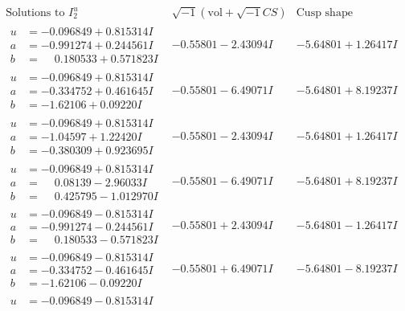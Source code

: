 \documentclass[1p]{elsarticle_modified}
\theoremstyle{definition}
\newcommand{\I}{\sqrt{-1}}
\begin{document}
$$\begin{array}{c|c|c}  
\text{Solutions to }I^u_{2}& \I (\text{vol} + \sqrt{-1}CS) & \text{Cusp shape}\\
 \hline 
\begin{aligned}
u &= -0.096849 + 0.815314 I \\
a &= -0.991274 + 0.244561 I \\
b &= \phantom{-}0.180533 + 0.571823 I\end{aligned}
 & -0.55801 - 2.43094 I & -5.64801 + 1.26417 I \\ \hline\begin{aligned}
u &= -0.096849 + 0.815314 I \\
a &= -0.334752 + 0.461645 I \\
b &= -1.62106 + 0.09220 I\end{aligned}
 & -0.55801 - 6.49071 I & -5.64801 + 8.19237 I \\ \hline\begin{aligned}
u &= -0.096849 + 0.815314 I \\
a &= -1.04597 + 1.22420 I \\
b &= -0.380309 + 0.923695 I\end{aligned}
 & -0.55801 - 2.43094 I & -5.64801 + 1.26417 I \\ \hline\begin{aligned}
u &= -0.096849 + 0.815314 I \\
a &= \phantom{-}0.08139 - 2.96033 I \\
b &= \phantom{-}0.425795 - 1.012970 I\end{aligned}
 & -0.55801 - 6.49071 I & -5.64801 + 8.19237 I \\ \hline\begin{aligned}
u &= -0.096849 - 0.815314 I \\
a &= -0.991274 - 0.244561 I \\
b &= \phantom{-}0.180533 - 0.571823 I\end{aligned}
 & -0.55801 + 2.43094 I & -5.64801 - 1.26417 I \\ \hline\begin{aligned}
u &= -0.096849 - 0.815314 I \\
a &= -0.334752 - 0.461645 I \\
b &= -1.62106 - 0.09220 I\end{aligned}
 & -0.55801 + 6.49071 I & -5.64801 - 8.19237 I \\ \hline\begin{aligned}
u &= -0.096849 - 0.815314 I \\

\end{aligned}
\end{array}$$
\end{document}
